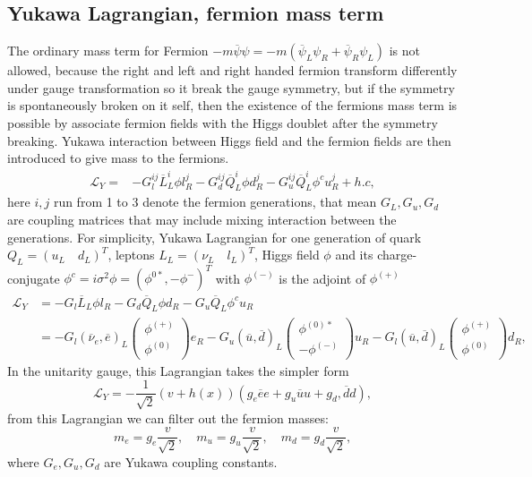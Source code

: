\documentclass{report}
\numberwithin{equation}{section}
\begin{document}
\subsection{Yukawa Lagrangian, fermion mass term}
The ordinary mass term for Fermion $-m\overline{\psi}\psi = -m(\overline{\psi}_L\psi_R+\overline{\psi}_R\psi_L)$ is not allowed, because the right and left and right handed fermion transform differently under gauge transformation so it break the gauge symmetry, but if the symmetry is spontaneously broken on it self, then the existence of the fermions mass term is possible by associate fermion fields with the Higgs doublet after the symmetry breaking. Yukawa interaction between Higgs field and the fermion fields are then introduced to give mass to the fermions.
\begin{equation}
\begin{split}
\mathcal{L}_Y=&-G_l^{ij}\overline{L}^{i}_L\phi l^{j}_R -G_d^{ij}\overline{Q}^{i}_L\phi d_R^{j}-G_u^{ij}\overline{Q}^{i}_L\phi^c u_R^{j}+h.c,
\end{split}
\end{equation}
here $i,j$ run from 1 to 3 denote the fermion generations, that mean $G_L,G_u,G_d$ are coupling matrices that may include mixing interaction between the generations. For simplicity, Yukawa Lagrangian for one generation of quark $Q_L=(u_L\quad d_L)^T$, leptons $L_L=(\nu_L\quad l_L)^T$, Higgs field $\phi$ and its charge-conjugate $\phi^c=i\sigma^2 \phi=(\phi^{0*},-\phi^-)^T$ with $\phi^{(-)}$ is the adjoint of $\phi^{(+)}$
\begin{equation}
\begin{split}
\mathcal{L}_Y&=-G_l\overline{L}_L\phi l_R -G_d\overline{Q}_L\phi d_R-G_u\overline{Q}_L\phi^c u_R\\
&=-G_l(\overline{\nu}_e,\overline{e})_L\begin{pmatrix}
\phi^{(+)}\\
\phi^{(0)}
\end{pmatrix}e_R-G_u(\overline{u},\overline{d})_L\begin{pmatrix}
\phi^{(0)*}\\
-\phi^{(-)}
\end{pmatrix}u_R-G_l(\overline{u},\overline{d})_L\begin{pmatrix}
\phi^{(+)}\\
\phi^{(0)}
\end{pmatrix}d_R,
\end{split}
\end{equation}
In the unitarity gauge, this Lagrangian takes the simpler form
\begin{equation}
\mathcal{L}_Y=-\frac{1}{\sqrt{2}}(v+h(x))(g_e \overline{e}e+g_u \overline{u}u+g_d, \overline{d}d),
\end{equation}
from this Lagrangian we can filter out the fermion masses:
\begin{equation}
m_e=g_e \frac{v}{\sqrt{2}}, \quad m_u=g_u \frac{v}{\sqrt{2}}, \quad m_d=g_d \frac{v}{\sqrt{2}},
\end{equation}
where $G_e,G_u,G_d$ are Yukawa coupling constants.
\end{document}
